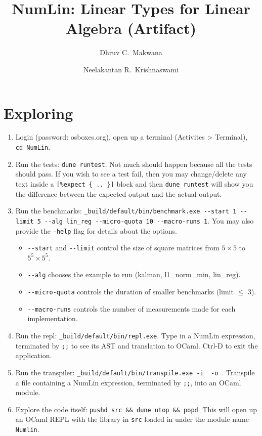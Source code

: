 \documentclass[a4paper,UKenglish]{lipics-v2019}
\title{NumLin: Linear Types for Linear Algebra (Artifact)}
\author{Dhruv C.~Makwana}{Unaffiliated \url{dhruvmakwana.com} }{dcm41@cam.ac.uk}{https://orcid.org/0000-0001-7220-4991}{}
\author{Neelakantan R.~Krishnaswami}{Department of Computer Science and Technology, University of Cambridge, United Kingdom}{nk480@cl.cam.ac.uk}{https://orcid.org/0000-0003-2838-5865}{}
\begin{document}
\maketitle%

\hypertarget{exploring}{%
\section{Exploring}\label{exploring}}

\begin{enumerate}
\item
  Login (password: osboxes.org), open up a terminal (Activites
  > Terminal), \texttt{cd\ NumLin}.
\item
  Run the tests: \texttt{dune\ runtest}. Not much should happen because
  all the tests should pass. If you wish to see a test fail, then you
  may change/delete any text inside a
  \texttt{{[}\%expect\ \{\textbar{}\ ..\ \textbar{}\}{]}} block and then
  \texttt{dune\ runtest} will show you the difference between the
  expected output and the actual output.
\item
  Run the benchmarks:
  \texttt{\_build/default/bin/benchmark.exe\ -\/-start\ 1\ -\/-limit\ 5\ -\/-alg\ lin\_reg\ -\/-micro-quota\ 10\ -\/-macro-runs\ 1}.
  You may also provide the \texttt{-help} flag for details about the
  options.
  \begin{itemize}
  \item
    \texttt{-\/-start} and \texttt{-\/-limit} control the size of square
    matrices from $5 \times 5$ to $5^5 \times 5^5$.
  \item
    \texttt{-\/-alg} chooses the example to run (kalman, l1\_norm\_min,
    lin\_reg).
  \item
      \texttt{-\/-micro-quota} controls the duration of smaller benchmarks (limit $\leq$ 3).
  \item
    \texttt{-\/-macro-runs} controls the number of measurements
    made for each implementation.
  \end{itemize}
\item
  Run the repl: \texttt{\_build/default/bin/repl.exe}. Type in a NumLin
  expression, terminated by \texttt{;;} to see its AST and translation
  to OCaml. Ctrl-D to exit the application.
\item
  Run the transpiler:
  \texttt{\_build/default/bin/transpile.exe\ -i\ <input-file>\ -o\ <output-file>}.
  Transpile a file containing a NumLin expression, terminated by
  \texttt{;;}, into an OCaml module.
\item
  Explore the code itself:
  \texttt{pushd\ src\ \&\&\ dune\ utop\ \&\&\ popd}. This will open up
  an OCaml REPL with the library in \texttt{src} loaded in under the
  module name \texttt{Numlin}.
\end{enumerate}
\end{document}
